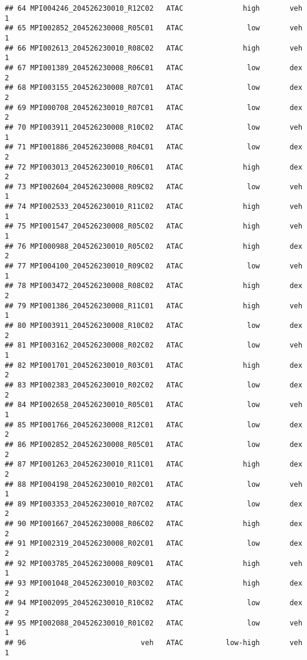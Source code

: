 \documentclass[
]{article}
\begin{document}
\begin{verbatim}
## 64 MPI004246_204526230010_R12C02   ATAC              high       veh         1
## 65 MPI002852_204526230008_R05C01   ATAC               low       veh         1
## 66 MPI002613_204526230010_R08C02   ATAC              high       veh         1
## 67 MPI001389_204526230008_R06C01   ATAC               low       dex         2
## 68 MPI003155_204526230008_R07C01   ATAC               low       dex         2
## 69 MPI000708_204526230010_R07C01   ATAC               low       dex         2
## 70 MPI003911_204526230008_R10C02   ATAC               low       veh         1
## 71 MPI001886_204526230008_R04C01   ATAC               low       dex         2
## 72 MPI003013_204526230010_R06C01   ATAC              high       dex         2
## 73 MPI002604_204526230008_R09C02   ATAC               low       veh         1
## 74 MPI002533_204526230010_R11C02   ATAC              high       veh         1
## 75 MPI001547_204526230008_R05C02   ATAC              high       veh         1
## 76 MPI000988_204526230010_R05C02   ATAC              high       dex         2
## 77 MPI004100_204526230010_R09C02   ATAC               low       veh         1
## 78 MPI003472_204526230008_R08C02   ATAC              high       dex         2
## 79 MPI001386_204526230008_R11C01   ATAC              high       veh         1
## 80 MPI003911_204526230008_R10C02   ATAC               low       dex         2
## 81 MPI003162_204526230008_R02C02   ATAC               low       veh         1
## 82 MPI001701_204526230010_R03C01   ATAC              high       dex         2
## 83 MPI002383_204526230010_R02C02   ATAC               low       dex         2
## 84 MPI002658_204526230010_R05C01   ATAC               low       veh         1
## 85 MPI001766_204526230008_R12C01   ATAC               low       dex         2
## 86 MPI002852_204526230008_R05C01   ATAC               low       dex         2
## 87 MPI001263_204526230010_R11C01   ATAC              high       dex         2
## 88 MPI004198_204526230010_R02C01   ATAC               low       veh         1
## 89 MPI003353_204526230010_R07C02   ATAC               low       dex         2
## 90 MPI001667_204526230008_R06C02   ATAC              high       dex         2
## 91 MPI002319_204526230008_R02C01   ATAC               low       dex         2
## 92 MPI003785_204526230008_R09C01   ATAC              high       veh         1
## 93 MPI001048_204526230010_R03C02   ATAC              high       dex         2
## 94 MPI002095_204526230010_R10C02   ATAC               low       dex         2
## 95 MPI002088_204526230010_R01C02   ATAC               low       veh         1
## 96                           veh   ATAC          low-high       veh         1

\end{verbatim}
\end{document}
